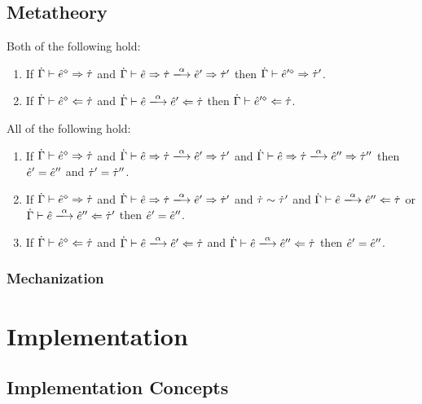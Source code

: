 \documentclass{llncs}
\begin{document}
\subsection{Metatheory}
\begin{theorem} Both of the following hold:
\label{thrm:actsafe}
\begin{enumerate}
\item If $\dot{\Gamma} \vdash \hat{e}^{\diamond} \Rightarrow \dot{\tau}$  and $\performSyn{\hGamma}{\zexp}{\htau}{\alpha}{\zexp'}{\htau'}$ then $\dot{\Gamma} \vdash \hat{e}'^{\diamond} \Rightarrow \dot{\tau}'$.
\item If  $\dot{\Gamma} \vdash \hat{e}^{\diamond} \Leftarrow \dot{\tau}$ and $\performAna{\hGamma}{\zexp}{\htau}{\alpha}{\zexp'}$ then $\dot{\Gamma} \vdash \hat{e}'^{\diamond} \Leftarrow \dot{\tau}$.
\end{enumerate}
\end{theorem}

\begin{theorem} All of the following hold:
\label{thrm:actdet}
\begin{enumerate}
\item If $\dot{\Gamma} \vdash \hat{e}^{\diamond} \Rightarrow \dot{\tau}$ and $\performSyn{\hGamma}{\zexp}{\htau}{\alpha}{\zexp'}{\htau'}$ and $\performSyn{\hGamma}{\zexp}{\htau}{\alpha}{\zexp''}{\htau''}$ then $\hat{e}' = \hat{e}''$ and $\dot{\tau}' = \dot{\tau}''$.
\item If $\dot{\Gamma} \vdash \hat{e}^{\diamond} \Rightarrow \dot{\tau}$ and $\performSyn{\hGamma}{\zexp}{\htau}{\alpha}{\zexp'}{\htau'}$ and $\dot{\tau} \sim \dot{\tau}'$ and $\performAna{\hGamma}{\zexp}{\htau}{\alpha}{\zexp''}$ or $\performAna{\hGamma}{\zexp}{\htau'}{\alpha}{\zexp''}$ then $\hat{e}' = \hat{e}''$.
\item If $\dot{\Gamma} \vdash \hat{e}^{\diamond} \Leftarrow \dot{\tau}$ and $\performAna{\hGamma}{\zexp}{\htau}{\alpha}{\zexp'}$ and $\performAna{\hGamma}{\zexp}{\htau}{\alpha}{\zexp''}$ then $\hat{e}' = \hat{e}''$.
\end{enumerate}
\end{theorem}


\subsubsection{Mechanization}


\section{Implementation}

\subsection{Implementation Concepts}
\end{document}
